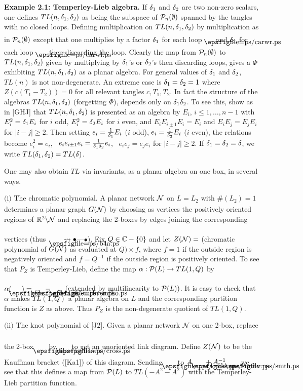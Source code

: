 {\bf Example 2.1: Temperley-Lieb algebra.}
If $\delta_1$ and $\delta_2$ are two non-zero scalars, one defines
$TL(n,\delta_1,\delta_2)$ as being the subspace of ${\cal P}_n(\emptyset)$
spanned by the tangles with no closed loops. Defining
multiplication on $TL(n,\delta_1,\delta_2)$ by multiplication as in
${\cal P}_n(\emptyset)$ except that one multiplies by a factor
$\delta_1$ for each loop $\caright$ and $\delta_2$
for each loop $\caleft$, then discarding the loop.
Clearly the map from ${\cal P}_n(\emptyset)$
to $TL(n,\delta_1,\delta_2)$ given by multiplying by $\delta_1$'s or $\delta_2$'s
then discarding loops, gives a $\Phi$ exhibiting
 $TL(n,\delta_1,\delta_2)$ as a planar algebra. For general values of
$\delta_1$ and $\delta_2$, $TL(n)$ is not non-degenerate. An extreme case is
$\delta_1=\delta_2=1$ where $Z(c(T_1-T_2))=0$ for all relevant tangles
$c,T_1,T_2$. In fact the structure of the algebras
$TL(n,\delta_1,\delta_2)$ (forgetting $\Phi$), depends only on $\delta_1\delta_2$.
To see this, show as in [GHJ] that $TL(n,\delta_1,\delta_2)$ is presented as
an algebra by $E_i$, $i\leq 1,\dots ,n-1$ with
$E^2_i=\delta_1E_i$ for $i$ odd, $E^2_i=\delta_2E_i$ for $i$ even, and
$E_iE_{i\pm 1}E_i=E_i$ and
$E_iE_j=E_jE_i$ for $|i-j|\geq 2$. Then setting
$e_i=\frac{1}{\delta_1}E_i$ ($i$ odd), $e_i=\frac{1}{\delta_2}E_i$ ($i$
even), the relations become $e^2_i=e_i$, \
$e_ie_{i\pm 1}e_i=\frac{1}{\delta_1\delta_2} e_i$, \
$e_ie_j=e_je_i$ for $|i-j|\geq 2$. If $\delta_1=\delta_2=\delta$, we write
$TL(\delta_1,\delta_2)=TL(\delta)$.

One may also obtain $TL$ via invariants, as a planar algebra on
one box, in several ways.

\medskip
$\underline{\mbox{(i) The chromatic polynomial.}}$ A planar network
$\cal N$ on
$L=L_2$ with \#$(L_2)\!=\!1$ determines a planar graph $G(\cal N)$
by choosing as vertices the positively oriented regions of $\Bbb
R^2\backslash\cal N$ and replacing the 2-boxes by edges joining the
corresponding vertices (thus \ $\fedgs \rightsquigarrow
\bullet$---$\bullet$). Fix $Q\in\Bbb C-\{0\}$ and let $Z(\cal N)=$
(chromatic polynomial of $G({\cal N})$ as evaluated at $Q)\times f$,
where $f\!=\!1$ if the outside region is negatively oriented and
$f=Q^{-1}$ if the outside region is positively oriented. To see that
${P}_Z$ is Temperley-Lieb, define the map $\alpha:{\cal P}(L)\to
TL(1,Q)$ by
$\alpha( \fedgs )=\smthvor  - \smtho $ (extended by multilinearity to
${\cal P}(L))$. It is easy to check that $\alpha$ makes $TL(1,Q)$ a
planar algebra on $L$ and the corresponding partition function is
$Z$ as above. Thus ${P}_Z$ is the non-degenerate quotient of
$TL(1,Q)$.

\medskip
$\underline{\mbox{(ii) The knot polynomial of [J2].}}$
Given a planar network $\cal N$ on one 2-box, replace the 2-box
$\fedgs$ by $\crss$ to get an unoriented link diagram.
Define $Z(\cal N)$ to be the Kauffman bracket ([Ka1]) of this
diagram. Sending $\crss$ to $A\  \smthv +A^{-1}\  \smth$
we see that this defines a map
from ${\cal P}(L)$ to $TL(-A^2-A^2)$ with the Temperley-Lieb
partition function.

